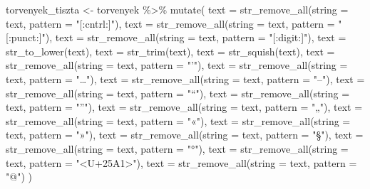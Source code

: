 \documentclass[
]{book}
\newenvironment{Shaded}{\begin{snugshade}}{\end{snugshade}}
\newcommand{\AttributeTok}[1]{\textcolor[rgb]{0.77,0.63,0.00}{#1}}
\newcommand{\FunctionTok}[1]{\textcolor[rgb]{0.00,0.00,0.00}{#1}}
\newcommand{\NormalTok}[1]{#1}
\newcommand{\OtherTok}[1]{\textcolor[rgb]{0.56,0.35,0.01}{#1}}
\newcommand{\SpecialCharTok}[1]{\textcolor[rgb]{0.00,0.00,0.00}{#1}}
\newcommand{\StringTok}[1]{\textcolor[rgb]{0.31,0.60,0.02}{#1}}
\begin{document}
\begin{Shaded}
\begin{Highlighting}[]
\NormalTok{torvenyek\_tiszta }\OtherTok{\textless{}{-}}\NormalTok{ torvenyek }\SpecialCharTok{\%\textgreater{}\%}
  \FunctionTok{mutate}\NormalTok{(}
    \AttributeTok{text =} \FunctionTok{str\_remove\_all}\NormalTok{(}\AttributeTok{string =}\NormalTok{ text, }\AttributeTok{pattern =} \StringTok{"[:cntrl:]"}\NormalTok{),}
    \AttributeTok{text =} \FunctionTok{str\_remove\_all}\NormalTok{(}\AttributeTok{string =}\NormalTok{ text, }\AttributeTok{pattern =} \StringTok{"[:punct:]"}\NormalTok{),}
    \AttributeTok{text =} \FunctionTok{str\_remove\_all}\NormalTok{(}\AttributeTok{string =}\NormalTok{ text, }\AttributeTok{pattern =} \StringTok{"[:digit:]"}\NormalTok{),}
    \AttributeTok{text =} \FunctionTok{str\_to\_lower}\NormalTok{(text),}
    \AttributeTok{text =} \FunctionTok{str\_trim}\NormalTok{(text),}
    \AttributeTok{text =} \FunctionTok{str\_squish}\NormalTok{(text),}
    \AttributeTok{text =} \FunctionTok{str\_remove\_all}\NormalTok{(}\AttributeTok{string =}\NormalTok{ text, }\AttributeTok{pattern =} \StringTok{"’"}\NormalTok{),}
    \AttributeTok{text =} \FunctionTok{str\_remove\_all}\NormalTok{(}\AttributeTok{string =}\NormalTok{ text, }\AttributeTok{pattern =} \StringTok{"…"}\NormalTok{),}
    \AttributeTok{text =} \FunctionTok{str\_remove\_all}\NormalTok{(}\AttributeTok{string =}\NormalTok{ text, }\AttributeTok{pattern =} \StringTok{"–"}\NormalTok{),}
    \AttributeTok{text =} \FunctionTok{str\_remove\_all}\NormalTok{(}\AttributeTok{string =}\NormalTok{ text, }\AttributeTok{pattern =} \StringTok{"“"}\NormalTok{),}
    \AttributeTok{text =} \FunctionTok{str\_remove\_all}\NormalTok{(}\AttributeTok{string =}\NormalTok{ text, }\AttributeTok{pattern =} \StringTok{"”"}\NormalTok{),}
    \AttributeTok{text =} \FunctionTok{str\_remove\_all}\NormalTok{(}\AttributeTok{string =}\NormalTok{ text, }\AttributeTok{pattern =} \StringTok{"„"}\NormalTok{),}
    \AttributeTok{text =} \FunctionTok{str\_remove\_all}\NormalTok{(}\AttributeTok{string =}\NormalTok{ text, }\AttributeTok{pattern =} \StringTok{"«"}\NormalTok{),}
    \AttributeTok{text =} \FunctionTok{str\_remove\_all}\NormalTok{(}\AttributeTok{string =}\NormalTok{ text, }\AttributeTok{pattern =} \StringTok{"»"}\NormalTok{),}
    \AttributeTok{text =} \FunctionTok{str\_remove\_all}\NormalTok{(}\AttributeTok{string =}\NormalTok{ text, }\AttributeTok{pattern =} \StringTok{"§"}\NormalTok{),}
    \AttributeTok{text =} \FunctionTok{str\_remove\_all}\NormalTok{(}\AttributeTok{string =}\NormalTok{ text, }\AttributeTok{pattern =} \StringTok{"°"}\NormalTok{),}
    \AttributeTok{text =} \FunctionTok{str\_remove\_all}\NormalTok{(}\AttributeTok{string =}\NormalTok{ text, }\AttributeTok{pattern =} \StringTok{"\textless{}U+25A1\textgreater{}"}\NormalTok{),}
    \AttributeTok{text =} \FunctionTok{str\_remove\_all}\NormalTok{(}\AttributeTok{string =}\NormalTok{ text, }\AttributeTok{pattern =} \StringTok{"@"}\NormalTok{)}
\NormalTok{  )}
\end{Highlighting}
\end{Shaded}
\end{document}
